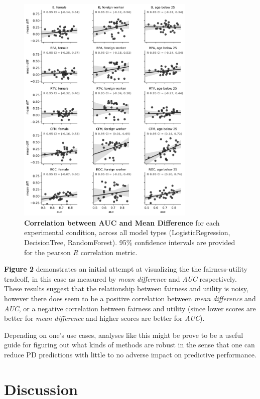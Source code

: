 \documentclass{acm_proc_article-sp}
\begin{document}
\begin{figure}[h]
\centering
\includegraphics[width=8.5cm]{IMG/fairness_utility_tradeoff.png}
\caption{
  \textbf{Correlation between AUC and Mean Difference} for each experimental
  condition, across all model types (LogisticRegression, DecisionTree,
  RandomForest). 95\% confidence intervals are provided for the pearson \(R\)
  correlation metric.
  }
\label{figure-2-fairness-utility-tradeoff}
\end{figure}

\textbf{Figure 2} demonstrates an initial attempt at visualizing the the
fairness-utility tradeoff, in this case as measured by \emph{mean difference}
and \emph{AUC} respectively. These results suggest that the relationship between
fairness and utility is noisy, however there does seem to be a positive
correlation between \emph{mean difference} and \emph{AUC}, or a negative
correlation between fairness and utility (since lower scores are better
for \emph{mean difference} and higher scores are better for \emph{AUC}).

Depending on one's use cases, analyses like this might be prove to be a useful
guide for figuring out what kinds of methods are robust in the sense that
one can reduce PD predictions with little to no adverse impact on predictive
performance.

\section{Discussion}
\end{document}
